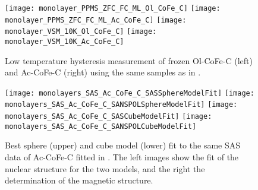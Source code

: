 \documentclass[\main/dresen_thesis.tex]{subfiles}
\begin{document}
    \begin{figure}[tb]
      \centering
      \texttt{[image: monolayer\_PPMS\_ZFC\_FC\_ML\_Ol\_CoFe\_C]}
      \texttt{[image: monolayer\_PPMS\_ZFC\_FC\_ML\_Ac\_CoFe\_C]}
      \texttt{[image: monolayer\_VSM\_10K\_Ol\_CoFe\_C]}
      \texttt{[image: monolayer\_VSM\_10K\_Ac\_CoFe\_C]}
      \caption{\label{fig:monolaye rs:nanoparticle:vsm10K}Low temperature hysteresis measurement of frozen Ol-CoFe-C (left) and Ac-CoFe-C (right) using the same samples as in .}
    \end{figure}

    \begin{figure}[tb]
      \centering
      \texttt{[image: monolayers\_SAS\_Ac\_CoFe\_C\_SASSphereModelFit]}
      \texttt{[image: monolayers\_SAS\_Ac\_CoFe\_C\_SANSPOLSphereModelFit]}
      \texttt{[image: monolayers\_SAS\_Ac\_CoFe\_C\_SASCubeModelFit]}
      \texttt{[image: monolayers\_SAS\_Ac\_CoFe\_C\_SANSPOLCubeModelFit]}
      \caption{\label{fig:monolayers:nanoparticle:sas:SphereCubeFit}Best sphere (upper) and cube model (lower) fit to the same SAS data of Ac-CoFe-C fitted in . The left images show the fit of the nuclear structure for the two models, and the right the determination of the magnetic structure.}
    \end{figure}
\end{document}
